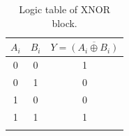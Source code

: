 \begin{table}[H]
  \caption{Logic table of XNOR block.}
  \centering
  \begin{tabular}{cc|c}
    \toprule
    $A_i$ & $B_i$ & $Y = \overline{(A_i \oplus B_i)}$ \\
    \midrule
    0 & 0 & 1 \\
    0 & 1 & 0 \\
    1 & 0 & 0 \\
    1 & 1 & 1 \\
    \bottomrule
    \label{tab:xnor}
  \end{tabular}
\end{table}
